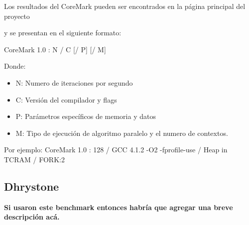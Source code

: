 Los resultados del CoreMark pueden ser encontrados en la página
principal del proyecto %

 y se presentan en el siguiente formato:
	
CoreMark 1.0 : N / C [/ P] [/ M]
	
Donde:
\begin{itemize}
\item N: Numero de iteraciones por segundo 
\item C: Versión del compilador y flags
\item P: Parámetros específicos de memoria y datos
\item M: Tipo de ejecución de algoritmo paralelo y el numero de contextos.
\end{itemize}	 
	
Por ejemplo: CoreMark 1.0 : 128 / GCC 4.1.2 -O2 -fprofile-use / Heap
in TCRAM / FORK:2
	
\subsection{Dhrystone}
 	
{\color{red}\textbf{Si usaron este benchmark entonces habría que
    agregar una breve descripción acá.}}

